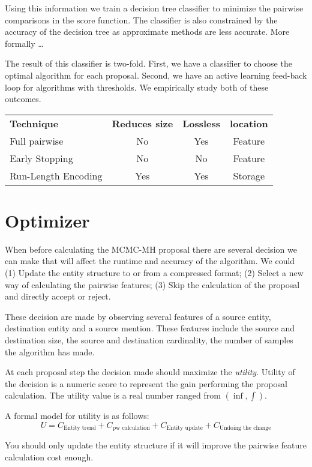 Using this information we train a decision tree classifier to minimize the 
pairwise comparisons in the score function.
The classifier is also constrained by the accuracy of the decision tree as 
approximate methods are less accurate.
More formally \ldots

The result of this classifier is two-fold.
First, we have a classifier to choose the optimal algorithm for each proposal.
Second, we have an active learning feed-back loop for algorithms with 
thresholds.
We empirically study both of these outcomes.

\begin{tabular}{l c c c}
\textbf{Technique} & \textbf{Reduces size} & \textbf{Lossless} & \textbf{location} \\
Full pairwise & No & Yes & Feature\\
Early Stopping~\cite{singh2012monte} & No & No & Feature\\
Run-Length Encoding & Yes & Yes & Storage\\
\end{tabular}



\section{Optimizer}

When before calculating the MCMC-MH proposal there are several decision we can make
that will affect the runtime and accuracy of the algorithm.
We could
(1) Update the entity structure to or from a compressed format;
(2) Select a new way of calculating the pairwise features;
(3) Skip the calculation of the proposal and directly accept or reject.

These decision are made by observing several features of a source entity,
destination entity and a source mention.
These features include the source and destination size, the source and
destination cardinality, the number of samples the algorithm has made.


At each proposal step the decision made should maximize the \textit{utility}.
Utility of the decision is a numeric score to represent the gain performing
the proposal calculation. The utility value is a real number ranged from $( \inf, \int)$.


A formal model for utility is as follows:
\begin{equation}
U = C_\text{Entity trend} +  %
    C_\text{pw calculation} +  %
    C_\text{Entity update} + %
    C_\text{Undoing the change} %
\end{equation}


You should only update the entity structure if it will improve the pairwise feature calculation cost enough.







